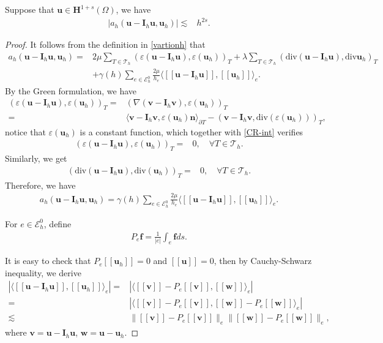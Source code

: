 \documentclass[10pt,a4paper]{amsart}
\def\E{{\mathcal{E}}}
\def\T{{\mathcal{T}}}
\def\bf{{\mathbf{f}}}
\def\bh{{\mathbf{H}}}
\def\bi{{\mathbf{I}}}
\def\bn{{\mathbf{n}}}
\def\bu{{\mathbf{u}}}
\def\bv{{\mathbf{v}}}
\def\bw{{\mathbf{w}}}
\def\sumT{\sum_{T\in\mathcal{T}_h}}     %
\newcommand{\di}{\text{div}}
\newcommand{\eps}{\varepsilon}
\newcommand{\la}{\langle}
\newcommand{\ra}{\rangle_{\partial T}}
\begin{document}
\begin{theorem}
	Suppose that $\bu\in\bh^{1+s}(\Omega)$, we have
	\begin{align}\label{lb1}
		|a_h(\bu-\bi_h\bu,\bu_h)|\lesssim&h^{2s}.
	\end{align}
\end{theorem}

\begin{proof} It follows from the definition in \eqref{vartionh} that
	\begin{align*}
		a_h(\bu-\bi_h\bu,\bu_h)=&2\mu\sumT(\eps(\bu-\bi_h\bu),\eps(\bu_h))_T +\lambda\sumT(\di(\bu-\bi_h\bu),\di\bu_h)_T\\
		\quad&+\gamma(h)\sum\limits_{e\in\E_h^0}\frac{2\mu}{h_e}\langle[\![\bu-\bi_h\bu]\!],[\![\bu_h]\!]\rangle_e.
	\end{align*}
	By the Green formulation, we have
	\begin{align*}
		(\eps(\bu-\bi_h\bu),\eps(\bu_h))_T=&(\nabla(\bv-\bi_h\bv),\eps(\bu_h))_T
		\\
		=&\la\bv-\bi_h\bv,\eps(\bu_h)\bn\ra-(\bv-\bi_h\bv,\di(\eps(\bu_h)))_T,
	\end{align*}
	notice that $\eps(\bu_h)$ is a constant function, which together with \eqref{CR-int} verifies
	\begin{align*}
		(\eps(\bu-\bi_h\bu),\eps(\bu_h))_T=&0,\quad\forall T\in\T_h.
	\end{align*}
	Similarly, we get
	\begin{align*}
		(\di(\bu-\bi_h\bu),\di(\bu_h))_T=&0,\quad\forall T\in\T_h.
	\end{align*}
	Therefore, we have
	\begin{eqnarray}\label{ahM}
		a_h(\bu-\bi_h\bu,\bu_h)=\gamma(h)\sum\limits_{e\in\E_h^0}\frac{2\mu}{h_e}\langle[\![\bu-\bi_h\bu]\!],[\![\bu_h]\!]\rangle_e.
	\end{eqnarray}
	
	For $e\in\E_h^0$, define
	\begin{eqnarray*}
		P_e\bf=\frac{1}{|e|}\int_e\bf ds.
	\end{eqnarray*}
	
	 It is easy to check that $P_e[\![\bu_h]\!]=0$ and $[\![\bu]\!]=0$, then by Cauchy-Schwarz inequality, we derive
	\begin{align}\label{ahM2}
		|\langle[\![\bu-\bi_h\bu]\!],[\![\bu_h]\!]\rangle_e|=&
		|\langle[\![\bv]\!]-P_e[\![\bv]\!],[\![\bw]\!]\rangle_e|\nonumber
		\\
		=&|\langle[\![\bv]\!]-P_e[\![\bv]\!],[\![\bw]\!]-P_e[\![\bw]\!]\rangle_e|
		\\
		\lesssim&\big\|[\![\bv]\!]-P_e[\![\bv]\!]\big\|_e\big\|[\![\bw]\!]-P_e[\![\bw]\!]\big\|_e\nonumber,
	\end{align}
	where $\bv=\bu-\bi_h\bu$, $\bw=\bu-\bu_h$.
	

\end{proof}
\end{document}
